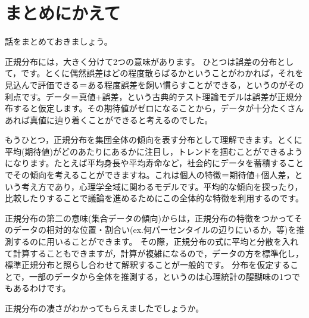 \section{まとめにかえて}
話をまとめておきましょう。

正規分布には，大きく分けて2つの意味があります。
ひとつは誤差の分布として，です。とくに偶然誤差はどの程度散らばるかということがわかれば，それを見込んで評価できる＝ある程度誤差を飼い慣らすことができる，というのがその利点です。データ＝真値+誤差，という古典的テスト理論モデルは誤差が正規分布すると仮定します。その期待値がゼロになることから，データが十分たくさんあれば真値に辿り着くことができると考えるのでした。

もうひとつ，正規分布を集団全体の傾向を表す分布として理解できます。とくに平均(期待値)がどのあたりにあるかに注目し，トレンドを掴むことができるようになります。たとえば平均身長や平均寿命など，社会的にデータを蓄積することでその傾向を考えることができますね。これは個人の特徴＝期待値+個人差，という考え方であり，心理学全域に関わるモデルです。平均的な傾向を探ったり，比較したりすることで議論を進めるためにこの全体的な特徴を利用するのです。

正規分布の第二の意味(集合データの傾向)からは，正規分布の特徴をつかってそのデータの相対的な位置・割合い(ex.何パーセンタイルの辺りにいるか，等)を推測するのに用いることができます。
その際，正規分布の式に平均と分散を入れて計算することもできますが，計算が複雑になるので，データの方を標準化し，標準正規分布と照らし合わせて解釈することが一般的です。
分布を仮定することで，一部のデータから全体を推測する，というのは心理統計の醍醐味の1つでもあるわけです。

正規分布の凄さがわかってもらえましたでしょうか。
